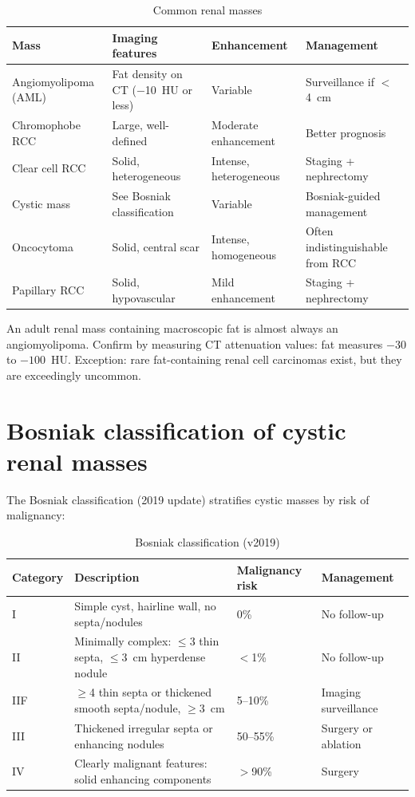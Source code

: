 \begin{table}[h]
\centering
\caption{Common renal masses}
\label{tab:renal_masses}
\begin{tabular}{@{}p{}p{}p{}p{}@{}}
\hline
\textbf{Mass} & \textbf{Imaging features} & \textbf{Enhancement} & \textbf{Management} \\
\hline
Angiomyolipoma (AML) & Fat density on CT ($-$10~HU or less) & Variable & Surveillance if $<$4~cm \\
Chromophobe RCC & Large, well-defined & Moderate enhancement & Better prognosis \\
Clear cell RCC & Solid, heterogeneous & Intense, heterogeneous & Staging + nephrectomy \\
Cystic mass & See Bosniak classification & Variable & Bosniak-guided management \\
Oncocytoma & Solid, central scar & Intense, homogeneous & Often indistinguishable from RCC \\
Papillary RCC & Solid, hypovascular & Mild enhancement & Staging + nephrectomy \\
\hline
\end{tabular}
\end{table}

\begin{pearlbox}
An adult renal mass containing macroscopic fat is almost always an angiomyolipoma. Confirm by measuring CT attenuation values: fat measures $-30$ to $-100$~HU. Exception: rare fat-containing renal cell carcinomas exist, but they are exceedingly uncommon.
\end{pearlbox}

\section{Bosniak classification of cystic renal masses}
The Bosniak classification (2019 update) stratifies cystic masses by risk of malignancy:

\begin{table}[h]
\centering
\caption{Bosniak classification (v2019)}
\label{tab:bosniak}
\begin{tabular}{@{}p{}p{}p{}p{}@{}}
\hline
\textbf{Category} & \textbf{Description} & \textbf{Malignancy risk} & \textbf{Management} \\
\hline
I & Simple cyst, hairline wall, no septa/nodules & 0\% & No follow-up \\
II & Minimally complex: $\leq$3 thin septa, $\leq$3~cm hyperdense nodule & $<$1\% & No follow-up \\
IIF & $\geq$4 thin septa or thickened smooth septa/nodule, $\geq$3~cm & 5--10\% & Imaging surveillance \\
III & Thickened irregular septa or enhancing nodules & 50--55\% & Surgery or ablation \\
IV & Clearly malignant features: solid enhancing components & $>$90\% & Surgery \\
\hline
\end{tabular}
\end{table}

